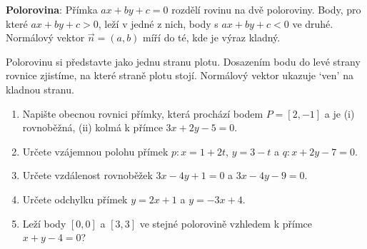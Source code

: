 \begin{definitionbox}
  \textbf{Polorovina}: Přímka $ax + by + c = 0$ rozdělí rovinu na dvě poloroviny. Body, pro které $ax + by + c > 0$, leží v jedné z nich, body s $ax + by + c < 0$ ve druhé. Normálový vektor $\vec{n} = (a, b)$ míří do té, kde je výraz kladný.
\end{definitionbox}

\begin{center}
\end{center}
Polorovinu si představte jako jednu stranu plotu. Dosazením bodu do levé strany rovnice zjistíme, na které straně plotu stojí. Normálový vektor ukazuje `ven' na kladnou stranu.

\begin{problem}
  \begin{enumerate}[label=(\alph*)]
    \item Napište obecnou rovnici přímky, která prochází bodem $P = [2, -1]$ a je (i) rovnoběžná, (ii) kolmá k přímce $3x + 2y - 5 = 0$.
    \item Určete vzájemnou polohu přímek $p: x = 1 + 2t$, $y = 3 - t$ a $q: x + 2y - 7 = 0$.
    \item Určete vzdálenost rovnoběžek $3x - 4y + 1 = 0$ a $3x - 4y - 9 = 0$.
    \item Určete odchylku přímek $y = 2x + 1$ a $y = -3x + 4$.
    \item Leží body $[0, 0]$ a $[3, 3]$ ve stejné polorovině vzhledem k přímce $x + y - 4 = 0$?
  \end{enumerate}
\end{problem}

